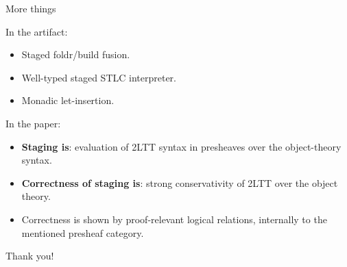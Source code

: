 \documentclass[dvipsnames,aspectratio=169]{beamer}
\theoremstyle{remark}
\begin{document}
\begin{frame}{More things}

In the artifact:
\begin{itemize}
  \item Staged foldr/build fusion.
  \item Well-typed staged STLC interpreter.
  \item Monadic let-insertion.
\end{itemize}
\vspace{1em}
\pause

In the paper:
\begin{itemize}
  \item \textbf{Staging is}: evaluation of 2LTT syntax in presheaves over the object-theory syntax.
  \item \textbf{Correctness of staging is}: strong conservativity of 2LTT over the object theory.
  \item Correctness is shown by proof-relevant logical relations, internally to the mentioned presheaf category.
\end{itemize}

\end{frame}

\begin{frame}{}

\begin{center}
  \Large {Thank you!}
\end{center}

\end{frame}
\end{document}

